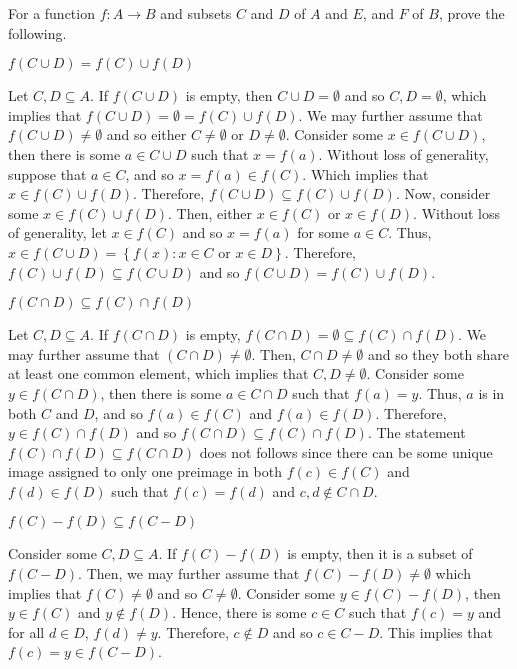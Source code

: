 \documentclass[12pt]{article}
\newenvironment{problem}[2][Problem]{\begin{trivlist} \item[\hskip \labelsep {\bfseries #1}\hskip \labelsep {\bfseries #2.}]}{\end{trivlist}}
\newenvironment{solution}[2][Solution]{\begin{trivlist} \item[\hskip \labelsep {\bfseries #1}\hskip \labelsep {\bfseries #2.}]}{\end{trivlist}}
\begin{document}
    \begin{problem}{12}
      For a function $f:A\to B$ and subsets $C$ and $D$ of $A$ and $E$, and $F$ of $B$, prove the following.
      \begin{enumerate}[label=(\alph*)]
	\item $f(C\cup D) = f(C)\cup f(D)$
	  \begin{solution}{(a)}
	    Let $C,D\subseteq A$. If $f(C\cup D)$ is empty, then $C\cup D = \emptyset$ and so $C,D=\emptyset$, which implies that $f(C\cup D) = \emptyset = f(C)\cup f(D)$. We may further assume that $f(C\cup D) \neq \emptyset$ and so either $C\neq \emptyset$ or $D\neq \emptyset$. Consider some $x\in f(C\cup D)$, then there is some $a\in C\cup D$ such that $x=f(a)$. Without loss of generality, suppose that $a\in C$, and so $x=f(a)\in f(C)$. Which implies that $x\in f(C)\cup f(D)$. Therefore, $f(C\cup D) \subseteq f(C)\cup f(D)$.
	    Now, consider some $x\in f(C)\cup f(D)$. Then, either $x\in f(C)$ or $x\in f(D)$. Without loss of generality, let $x\in f(C)$ and so $x=f(a)$ for some $a\in C$. Thus, $x\in f(C\cup D) =\left\{f(x):x\in C\text{ or }x\in D \right\}$. Therefore, $f(C)\cup f(D)\subseteq f(C\cup D)$ and so $f(C\cup D) = f(C)\cup f(D)$.
          \end{solution}
	\item $f(C\cap D) \subseteq f(C)\cap f(D)$
	  \begin{solution}{(b)}
	    Let $C,D\subseteq A$. If $f(C\cap D)$ is empty, $f(C\cap D) = \emptyset \subseteq f(C)\cap f(D)$. We may further assume that $(C\cap D)\neq \emptyset$. Then, $C\cap D\neq \emptyset$ and so they both share at least one common element, which implies that $C,D\neq \emptyset$. Consider some $y\in f(C\cap D)$, then there is some $a\in C\cap D$ such that $f(a)=y$. Thus, $a$ is in both $C$ and $D$, and so $f(a)\in f(C)$ and $f(a)\in f(D)$. Therefore, $y\in f(C)\cap f(D)$ and so $f(C\cap D)\subseteq f(C)\cap f(D)$. 
	    The statement $f(C)\cap f(D)\subseteq f(C\cap D)$ does not follows since there can be some unique image assigned to only one preimage in both $f(c)\in f(C)$ and $f(d)\in f(D)$ such that $f(c) = f(d)$ and $c,d\not\in C\cap D$. 
    \end{solution}
	\item $f(C)-f(D) \subseteq f(C-D)$
	  \begin{solution}{(c)}
	    Consider some $C,D\subseteq A$. If $f(C)-f(D)$ is empty, then it is a subset of $f(C-D)$. Then, we may further assume that $f(C)-f(D)\neq \emptyset$ which implies that $f(C)\neq \emptyset$ and so $C\neq \emptyset$. Consider some $y\in f(C)-f(D)$, then $y\in f(C)$ and $y\not\in f(D)$. Hence, there is some $c\in C$ such that $f(c)=y$ and for all $d\in D$, $f(d)\neq y$. Therefore, $c\not\in D$ and so $c\in C-D$. This implies that $f(c)=y\in f(C-D)$. 

\end{solution}
\end{enumerate}
\end{problem}
\end{document}
